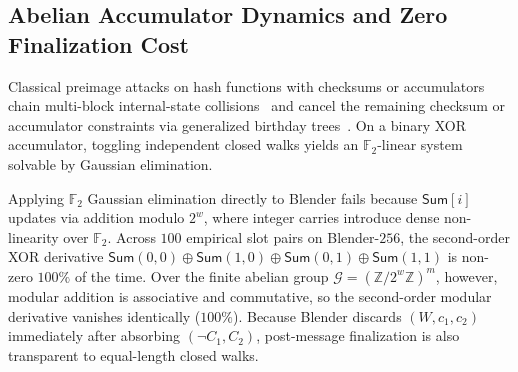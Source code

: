 \documentclass[11pt,a4paper]{article}
\theoremstyle{definition}
\theoremstyle{remark}
\newcommand{\Ftwo}{\mathbb{F}_2}
\newcommand{\Zmod}[1]{\mathbb{Z}/2^{#1}\mathbb{Z}}
\newcommand{\SumAcc}{\mathsf{Sum}}
\begin{document}
\subsection{Abelian Accumulator Dynamics and Zero Finalization Cost}
\label{subsec:dsos-zero-cinv}
Classical preimage attacks on hash functions with checksums or accumulators chain multi-block internal-state collisions~\cite{Jou04} and cancel the remaining checksum or accumulator constraints via generalized birthday trees~\cite{Wag02,GK08,MPRKS08}. On a binary XOR accumulator, toggling independent closed walks yields an $\Ftwo$-linear system solvable by Gaussian elimination.

Applying $\Ftwo$ Gaussian elimination directly to Blender fails because $\SumAcc[i]$ updates via addition modulo $2^w$, where integer carries introduce dense non-linearity over $\Ftwo$. Across $100$ empirical slot pairs on Blender-$256$, the second-order XOR derivative $\SumAcc(0,0) \oplus \SumAcc(1,0) \oplus \SumAcc(0,1) \oplus \SumAcc(1,1)$ is non-zero $100\%$ of the time. Over the finite abelian group $\mathcal{G} = (\Zmod{w})^m$, however, modular addition is associative and commutative, so the second-order modular derivative vanishes identically ($100\%$). Because Blender discards $(W, c_1, c_2)$ immediately after absorbing $(\neg C_1, C_2)$, post-message finalization is also transparent to equal-length closed walks.
\end{document}
